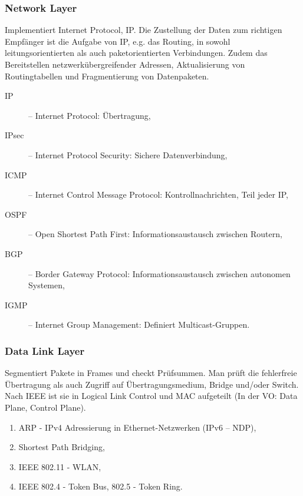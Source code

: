 \documentclass{scrartcl}
\begin{document}
    \subsubsection{Network Layer}
    \label{OSI:network_layer}
    Implementiert Internet Protocol, IP. Die Zustellung der Daten zum richtigen Empfänger ist die Aufgabe von IP, e.g. das Routing, in sowohl leitungsorientierten als auch paketorientierten Verbindungen. 
    Zudem das Bereitstellen netzwerkübergreifender Adressen, Aktualisierung von Routingtabellen und Fragmentierung von Datenpaketen. 
    \begin{description}
        \item [IP] -- Internet Protocol: Übertragung,
        \item [IPsec] -- Internet Protocol Security: Sichere Datenverbindung,
        \item [ICMP] -- Internet Control Message Protocol: Kontrollnachrichten, Teil jeder IP,
        \item [OSPF] -- Open Shortest Path First: Informationsaustausch zwischen Routern,
        \item [BGP] -- Border Gateway Protocol: Informationsaustausch zwischen autonomen Systemen,
        \item [IGMP] -- Internet Group Management: Definiert Multicast-Gruppen.
          
        \end{description}

        

    \subsubsection{Data Link Layer}
    \label{OSI:data_link_layer}
    Segmentiert Pakete in Frames und checkt Prüfsummen. 
    Man prüft die fehlerfreie Übertragung als auch Zugriff auf Übertragungsmedium, 
    Bridge und/oder Switch. Nach IEEE ist sie in Logical Link Control und MAC aufgeteilt (In der VO: Data Plane, Control Plane). 
    
    \begin{enumerate}
        \item ARP - IPv4 Adressierung in Ethernet-Netzwerken (IPv6 -- NDP),
        \item Shortest Path Bridging,
        \item IEEE 802.11 - WLAN,
        \item IEEE 802.4 - Token Bus, 802.5 - Token Ring.
    \end{enumerate}
\end{document}
